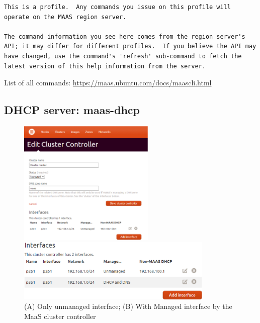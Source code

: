 {\begin{verbatim}
This is a profile.  Any commands you issue on this profile will
operate on the MAAS region server.

The command information you see here comes from the region server's
API; it may differ for different profiles.  If you believe the API may
have changed, use the command's 'refresh' sub-command to fetch the
latest version of this help information from the server.

\end{verbatim}
}

List of all commands:
\url{https://maas.ubuntu.com/docs/maascli.html}




\subsection{DHCP server: maas-dhcp}
\label{sec:MaaS_maas-dhcp}


\begin{figure}[hbt]
  \centerline{\includegraphics[height=6cm,
    angle=0]{./images/MaaS_cluster-network_interface.eps}}
  \centerline{\includegraphics[height=3cm,
    angle=0]{./images/MaaS_managed_interface.eps}}
\caption{(A) Only unmanaged interface; (B) With Managed interface by the MaaS
cluster controller}
\label{fig:MaaS_cluster-network_interface}
\end{figure}



